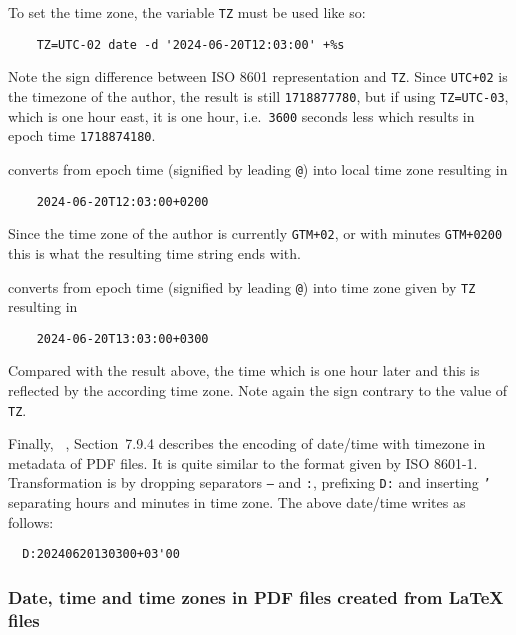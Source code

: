 \documentclass[a4paper, english]{article}%
\begin{document}
\begin{description}[style=nextline]
  To set the time zone, the variable \texttt{TZ} must be used like so: 
  \begin{verbatim}
    TZ=UTC-02 date -d '2024-06-20T12:03:00' +%s
  \end{verbatim}
  Note the sign difference between ISO 8601 representation and \texttt{TZ}. 
  Since \texttt{UTC+02} is the timezone of the author, the result is still \texttt{1718877780}, 
  but if using \texttt{TZ=UTC-03}, which is one hour east, 
  it is one hour, i.e.~\@ \texttt{3600} seconds less which results in epoch time \texttt{1718874180}. 
  \item[\texttt{date -d '@1718877780' +\%FT\%T\%z}] 
  converts from epoch time (signified by leading \texttt{@}) into local time zone resulting in 
  \begin{verbatim}
    2024-06-20T12:03:00+0200
  \end{verbatim}
  Since the time zone of the author is currently \texttt{GTM+02}, or with minutes \texttt{GTM+0200}
  this is what the resulting time string ends with. 
  \item[\texttt{TZ=UTC-03 date -d '@1718877780' +\%FT\%T\%z}] 
  converts from epoch time (signified by leading \texttt{@}) into time zone given by \texttt{TZ} resulting in 
  \begin{verbatim}
    2024-06-20T13:03:00+0300
  \end{verbatim}
  Compared with the result above, the time which is one hour later 
  and this is reflected by the according time zone. 
  Note again the sign contrary to the value of \texttt{TZ}. 
\end{description}


Finally, ~\cite{Pdf20}, Section~7.9.4 describes the encoding 
of date/time with timezone in metadata of PDF files. 
It is quite similar to the format given by ISO 8601-1. 
Transformation is by dropping separators \texttt{--} and \texttt{:}, 
prefixing \texttt{D:} and inserting \texttt{'} separating hours and minutes in time zone. 
The above date/time writes as follows: 
%
\begin{verbatim}
  D:20240620130300+03'00
\end{verbatim}

\subsubsection{Date, time and time zones in PDF files created from \LaTeX{} files}
\label{subsubsec:dateTimeZoneTexPdf}
\end{document}
